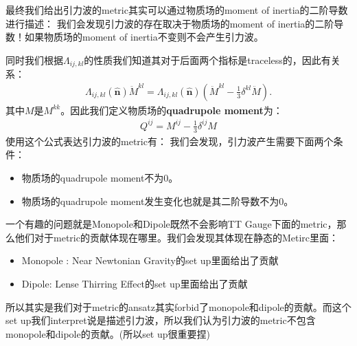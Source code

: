 \bigskip
{}

最终我们给出引力波的metric其实可以通过物质场的moment of inertia的二阶导数进行描述：
我们会发现引力波的存在取决于物质场的moment of inertia的二阶导数！如果物质场的moment of inertia不变则不会产生引力波。

同时我们根据$ \Lambda_{ij,kl} $的性质我们知道其对于后面两个指标是traceless的，因此有关系：
\begin{align}
  \Lambda_{ij,kl}(\hat{\mathbf{n}}) \ddot{M}^{kl} =
  \Lambda_{ij,kl}(\hat{\mathbf{n}}) \left( \ddot{M}^{kl} -
  \frac{1}{3} \delta^{kl} \ddot{M} \right).
\end{align}
其中$ M $是$ M^{kk} $。因此我们定义物质场的\textbf{quadrupole moment}为：
\begin{align}
  Q^{ij} = M^{ij} - \frac{1}{3} \delta^{ij} M
\end{align}
使用这个公式表达引力波的metric有：
我们会发现，引力波产生需要下面两个条件：
\begin{itemize}
  \item 物质场的quadrupole moment不为0。
  \item 物质场的quadrupole moment发生变化也就是其二阶导数不为0。
\end{itemize}


\bigskip
{}

一个有趣的问题就是Monopole和Dipole既然不会影响TT
Gauge下面的metric，那么他们对于metric的贡献体现在哪里。我们会发现其体现在静态的Metirc里面：
\begin{itemize}
  \item Monopole : Near Newtonian Gravity的set up里面给出了贡献
  \item Dipole: Lense Thirring Effect的set up里面给出了贡献
\end{itemize}
所以其实是我们对于metric的ansatz其实forbid了monopole和dipole的贡献。而这个set
up我们interpret说是描述引力波，所以我们认为引力波的metric不包含monopole和dipole的贡献。(所以set up很重要捏)

